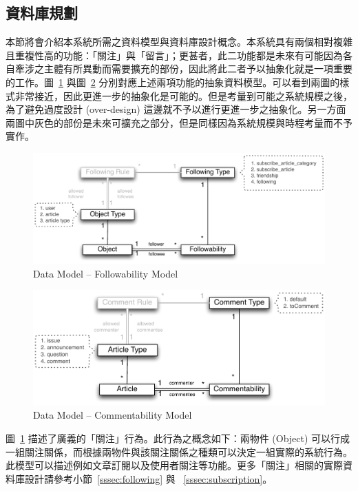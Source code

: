\subsection{資料庫規劃}

本節將會介紹本系統所需之資料模型與資料庫設計概念。本系統具有兩個相對複雜且重複性高的功能：「關注」與「留言」；更甚者，此二功能都是未來有可能因為各自牽涉之主體有所異動而需要擴充的部份，因此將此二者予以抽象化就是一項重要的工作。圖~\ref{pic:data:followability} 與圖~\ref{pic:data:commentability} 分別對應上述兩項功能的抽象資料模型。可以看到兩圖的樣式非常接近，因此更進一步的抽象化是可能的。但是考量到可能之系統規模之後，為了避免過度設計 (over-design) 這邊就不予以進行更進一步之抽象化。另一方面兩圖中灰色的部份是未來可擴充之部分，但是同樣因為系統規模與時程考量而不予實作。

\begin{figure}[h]
\centering
\includegraphics[width=1.05\textwidth]{img/datamodel/followability_real.pdf}
\caption{Data Model -- Followability Model}
\label{pic:data:followability}
\end{figure}

\begin{figure}[h]
\centering
\includegraphics[width=1.05\textwidth]{img/datamodel/commentability.pdf}
\caption{Data Model -- Commentability Model}
\label{pic:data:commentability}
\end{figure}

圖~\ref{pic:data:followability} 描述了廣義的「關注」行為。此行為之概念如下：兩物件 (Object)  可以行成一組關注關係，而根據兩物件與該關注關係之種類可以決定一組實際的系統行為。此模型可以描述例如文章訂閱以及使用者關注等功能。更多「關注」相關的實際資料庫設計請參考小節~\ref{sssec:following} 與 ~\ref{sssec:subscription}。

